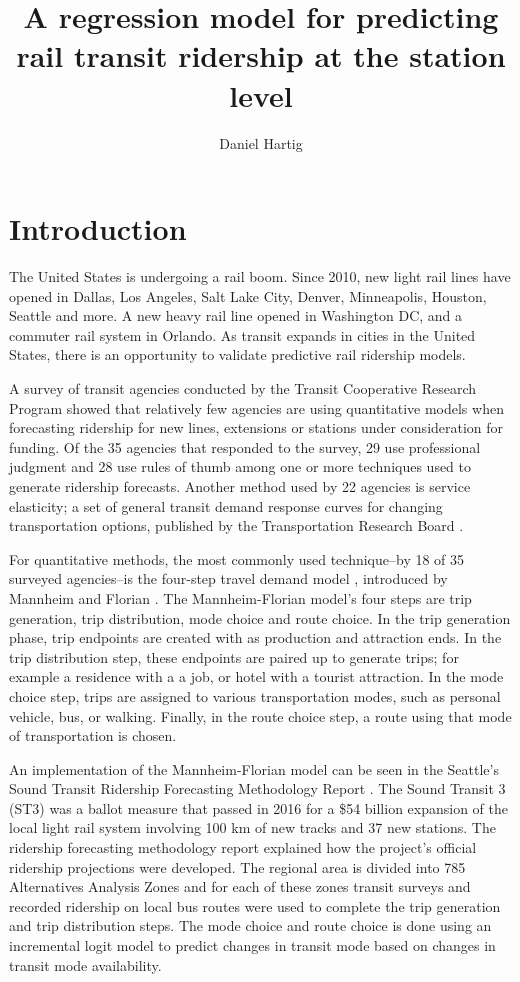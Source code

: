 \documentclass[11pt]{article}
\title{A regression model for predicting rail transit ridership at the station level}
\author{Daniel Hartig}
\date{\vspace{-5ex}}
\begin{document}
\maketitle

\section{Introduction}

The United States is undergoing a rail boom. Since 2010, new light rail lines have opened in Dallas, Los Angeles, Salt Lake City, Denver, Minneapolis, Houston, Seattle and more.  A new heavy rail line opened in Washington DC, and a commuter rail system in Orlando. As transit expands in cities in the United States, there is an opportunity to validate predictive rail ridership models. 

A survey of transit agencies \cite{Boyle2006} conducted by the Transit Cooperative Research Program showed that relatively few agencies are using quantitative models when forecasting ridership for new lines, extensions or stations under consideration for funding. Of the 35 agencies that responded to the survey, 29 use professional judgment and 28 use rules of thumb among one or more techniques used to generate ridership forecasts. Another method used by 22 agencies is service elasticity; a set of general transit demand response curves for changing transportation options, published by the Transportation Research Board \cite{tcrp95}. 

For quantitative methods, the most commonly used technique--by 18 of 35 surveyed agencies--is the four-step travel demand model \cite{McNally2008}, introduced by Mannheim and Florian \cite{Mannheim1979, Florian1988}. The Mannheim-Florian model's four steps are trip generation, trip distribution, mode choice and route choice. In the trip generation phase, trip endpoints are created with as production and attraction ends. In the trip distribution step, these endpoints are paired up to generate trips; for example a residence with a a job, or hotel with a tourist attraction. In the mode choice step, trips are assigned to various transportation modes, such as personal vehicle, bus, or walking. Finally, in the route choice step, a route using that mode of transportation is chosen.

An implementation of the Mannheim-Florian model can be seen in the Seattle's Sound Transit Ridership Forecasting Methodology Report \cite{ST3_2015, ST3_add}. The Sound Transit 3 (ST3) was a ballot measure that passed in 2016 for a \$54 billion expansion of the local light rail system involving 100 km of new tracks and 37 new stations. The ridership forecasting methodology report explained how the project's official ridership projections were developed. The regional area is divided into 785 Alternatives Analysis Zones and for each of these zones transit surveys and recorded ridership on local bus routes were used to complete the trip generation and trip distribution steps. The mode choice and route choice is done using an incremental logit model to predict changes in transit mode based on changes in transit mode availability.
\end{document}
